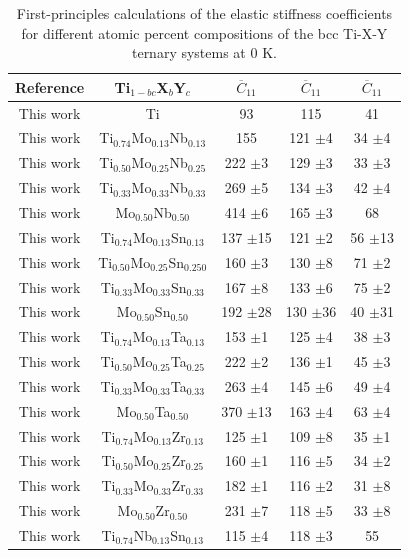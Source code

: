 \newpage
\begin{longtable}[H]{ c c c c c}
	\caption{First-principles calculations of the elastic stiffness coefficients for different atomic percent compositions of the bcc Ti-X-Y ternary systems at 0 K.} 	\label{Ch6-table:tixyecijdata} \\
	\hline
	Reference & Ti$_{1-bc}$X$_b$Y$_c$ & $\overline{C}_{11}$ & $\overline{C}_{11}$ & $\overline{C}_{11}$ \\
	\hline
	\endhead
	\hline
	\endfoot
	This work & Ti & 93 & 115 & 41 \\
	This work & Ti$_{0.74}$Mo$_{0.13}$Nb$_{0.13}$ & 155 & 121 $\pm$4 & 34 $\pm$4 \\
	This work & Ti$_{0.50}$Mo$_{0.25}$Nb$_{0.25}$ & 222 $\pm$3 & 129 $\pm$3 & 33 $\pm$3 \\
	This work & Ti$_{0.33}$Mo$_{0.33}$Nb$_{0.33}$ & 269 $\pm$5 & 134 $\pm$3 & 42 $\pm$4 \\
	This work & Mo$_{0.50}$Nb$_{0.50}$ & 414 $\pm$6 & 165 $\pm$3 & 68 \\
	This work & Ti$_{0.74}$Mo$_{0.13}$Sn$_{0.13}$ & 137 $\pm$15 & 121 $\pm$2 & 56 $\pm$13 \\
	This work & Ti$_{0.50}$Mo$_{0.25}$Sn$_{0.250}$ & 160 $\pm$3 & 130 $\pm$8 & 71 $\pm$2 \\
	This work & Ti$_{0.33}$Mo$_{0.33}$Sn$_{0.33}$ & 167 $\pm$8 & 133 $\pm$6 & 75 $\pm$2 \\
	This work & Mo$_{0.50}$Sn$_{0.50}$ & 192 $\pm$28 & 130 $\pm$36 & 40 $\pm$31 \\
	This work & Ti$_{0.74}$Mo$_{0.13}$Ta$_{0.13}$ & 153 $\pm$1 & 125 $\pm$4 & 38 $\pm$3 \\
	This work & Ti$_{0.50}$Mo$_{0.25}$Ta$_{0.25}$ & 222 $\pm$2 & 136 $\pm$1 & 45 $\pm$3 \\
	This work & Ti$_{0.33}$Mo$_{0.33}$Ta$_{0.33}$ & 263 $\pm$4 & 145 $\pm$6 & 49 $\pm$4 \\
	This work & Mo$_{0.50}$Ta$_{0.50}$ & 370 $\pm$13 & 163 $\pm$4 & 63 $\pm$4 \\
	This work & Ti$_{0.74}$Mo$_{0.13}$Zr$_{0.13}$ & 125 $\pm$1 & 109 $\pm$8 & 35 $\pm$1 \\
	This work & Ti$_{0.50}$Mo$_{0.25}$Zr$_{0.25}$ & 160 $\pm$1 & 116 $\pm$5 & 34 $\pm$2 \\
	This work & Ti$_{0.33}$Mo$_{0.33}$Zr$_{0.33}$ & 182 $\pm$1 & 116 $\pm$2 & 31 $\pm$8 \\
	This work & Mo$_{0.50}$Zr$_{0.50}$ & 231 $\pm$7 & 118 $\pm$5 & 33 $\pm$8 \\
	This work & Ti$_{0.74}$Nb$_{0.13}$Sn$_{0.13}$ & 115 $\pm$4 & 118 $\pm$3 & 55 \\

\end{longtable}
